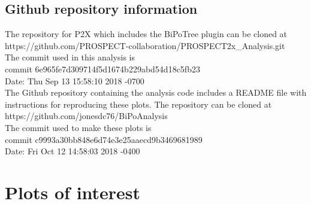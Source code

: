 \subsection{Github repository information\label{sec:github}}
The repository for P2X which includes the BiPoTree plugin can be cloned at\\ https://github.com/PROSPECT-collaboration/PROSPECT2x\_Analysis.git\\
The commit used in this analysis is \\
commit 6e965fe7d309714f5d1674b229abd54d18c5fb23\\
Date:   Thu Sep 13 15:58:10 2018 -0700\\

The Github repository containing the analysis code includes a README file with instructions for reproducing these plots. The repository can be cloned at \\
https://github.com/jonesdc76/BiPoAnalysis\\
The commit used to make these plots is\\
commit c9993a30bb848e6d74e3e25aaecd9b3469681989\\
Date:   Fri Oct 12 14:58:03 2018 -0400\\
\newpage
\section{Plots of interest}
